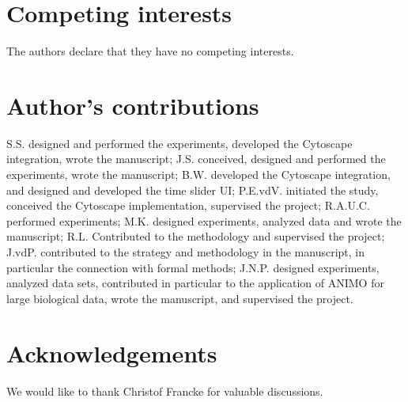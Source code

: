 \documentclass{bmcart}
\begin{document}
\begin{backmatter}

\section*{Competing interests}
The authors declare that they have no competing interests.

\section*{Author's contributions}
S.S. designed and performed the experiments, developed the Cytoscape integration, wrote
the manuscript; J.S. conceived, designed and performed the experiments, wrote the
manuscript; B.W. developed the Cytoscape integration, and designed and developed the
time slider UI; P.E.vdV. initiated the study, conceived the Cytoscape implementation, supervised the
project; R.A.U.C. performed experiments; M.K. designed experiments, analyzed data and
wrote the manuscript; R.L. Contributed to the methodology and supervised the project;
J.vdP. contributed to the strategy and methodology in the manuscript, in particular the
connection with formal methods; J.N.P. designed experiments, analyzed data sets, contributed
in particular to the application of ANIMO for large biological data, wrote the manuscript,
and supervised the project.

\section*{Acknowledgements}
We would like to thank Christof Francke for valuable discussions.


\end{backmatter}
\end{document}
